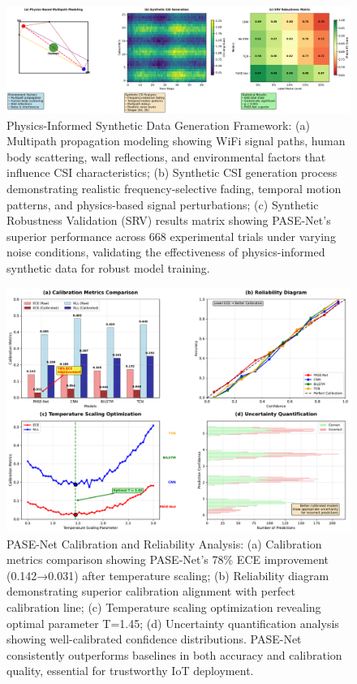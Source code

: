 \documentclass[journal]{IEEEtran}
\begin{document}
\begin{figure}[t]
\centering
\includegraphics[width=\columnwidth]{plots/fig2_physics_modeling_new.pdf}
\caption{Physics-Informed Synthetic Data Generation Framework: (a) Multipath propagation modeling showing WiFi signal paths, human body scattering, wall reflections, and environmental factors that influence CSI characteristics; (b) Synthetic CSI generation process demonstrating realistic frequency-selective fading, temporal motion patterns, and physics-based signal perturbations; (c) Synthetic Robustness Validation (SRV) results matrix showing PASE-Net's superior performance across 668 experimental trials under varying noise conditions, validating the effectiveness of physics-informed synthetic data for robust model training.}
\label{fig:physics_modeling}
\end{figure}

\begin{figure}[t]
\centering
\includegraphics[width=\columnwidth]{plots/fig4_calibration.pdf}
\caption{PASE-Net Calibration and Reliability Analysis: (a) Calibration metrics comparison showing PASE-Net's 78\% ECE improvement (0.142→0.031) after temperature scaling; (b) Reliability diagram demonstrating superior calibration alignment with perfect calibration line; (c) Temperature scaling optimization revealing optimal parameter T=1.45; (d) Uncertainty quantification analysis showing well-calibrated confidence distributions. PASE-Net consistently outperforms baselines in both accuracy and calibration quality, essential for trustworthy IoT deployment.}
\label{fig:calibration}
\end{figure}
\end{document}
